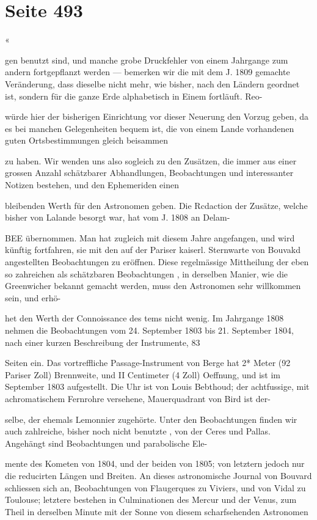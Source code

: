 \documentclass[10pt,a4paper]{article}
\begin{document}
\newpage
\section*{Seite 493}
«

gen benutzt sind, und manche grobe Druckfehler von einem Jahrgange zum andern fortgepflanzt werden — bemerken wir die mit dem J. 1809 gemachte Veränderung, dass dieselbe nicht mehr, wie bisher, nach den Ländern geordnet ist, sondern für die ganze Erde alphabetisch in Einem fortläuft. Reo-

würde hier der bisherigen Einrichtung vor dieser Neuerung den Vorzug geben, da es bei manchen Gelegenheiten bequem ist, die von einem Lande vorhandenen guten Ortsbestimmungen gleich beisammen

zu haben. Wir wenden uns also sogleich zu den Zusätzen, die immer aus einer grossen Anzahl schätzbarer Abhandlungen, Beobachtungen und interessanter Notizen bestehen, und den Ephemeriden einen

bleibenden Werth für den Astronomen geben. Die Rcdaction der Zusätze, welche bisher von Lalande besorgt war, hat vom J. 1808 an Delam-

BEE übernommen. Man hat zugleich mit diesem Jahre angefangen, und wird künftig fortfahren, sie mit den auf der Pariser kaiserl. Sternwarte von Bouvakd angestellten Beobachtungen zu eröffnen. Diese regelmässige Mittheilung der eben so zahreichen als schätzbaren Beobachtungen , in derselben Manier, wie die Greenwicher bekannt gemacht werden, muss den Astronomen sehr willkommen sein, und erhö-

het den Werth der Connoissance des tems nicht wenig. Im Jahrgange 1808 nehmen die Beobachtungen vom 24. September 1803 bis 21. September 1804, nach einer kurzen Beschreibung der Instrumente, 83

Seiten ein. Das vortreffliche Passage-Instrument von Berge hat 2* Meter (92 Pariser Zoll) Brennweite, und II Centimeter (4 Zoll) Oeffnung, und ist im September 1803 aufgestellt. Die Uhr ist von Louis Bebthoud; der achtfussige, mit achromatischem Fernrohre versehene, Mauerquadrant von Bird ist der-

selbe, der ehemals Lemonnier zugehörte. Unter den Beobachtungen finden wir auch zahlreiche, bisher noch nicht benutzte , von der Ceres und Pallas. Angehängt sind Beobachtungen und parabolische Ele-

mente des Kometen von 1804, und der beiden von 1805; von letztern jedoch nur die reducirten Längen und Breiten. An dieses astronomische Journal von Bouvard schliessen sich an, Beobachtungen von Flaugerques zu Viviers, und von Vidal zu Toulouse; letztere bestehen in Culminationen des Mercur und der Venus, zum Theil in derselben Minute mit der Sonne von diesem scharfsehenden Astronomen
\end{document}
